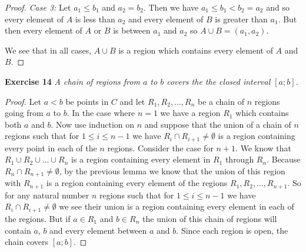 \documentclass{article}
\begin{document}
\begin{flushleft}
\begin{proof}
\textsl{Case 3:} Let $a_1 \leq b_1$ and $a_2=b_2$. Then we have $a_1 \leq b_1<b_2=a_2$ and so every element of $A$ is less than $a_2$ and every element of $B$ is greater than $a_1$. But then every element of $A$ or $B$ is between $a_1$ and $a_2$ so $A \cup B = (a_1,a_2)$.\newline

We see that in all cases, $A \cup B$ is a region which contains every element of $A$ and $B$.
\end{proof}

\textbf{Exercise 14}
\textsl{A chain of regions from $a$ to $b$ covers the the closed interval $[a;b]$.}
\begin{proof}
Let $a<b$ be points in $C$ and let $R_1,R_2, \dots ,R_n$ be a chain of $n$ regions going from $a$ to $b$. In the case where $n=1$ we have a region $R_1$ which contains both $a$ and $b$. Now use induction on $n$ and suppose that the union of a chain of $n$ regions such that for $1 \leq i \leq n-1$ we have $R_i \cap R_{i+1} \neq \emptyset$ is a region containing every point in each of the $n$ regions. Consider the case for $n+1$. We know that $R_1 \cup R_2 \cup  \dots \cup R_n$ is a region containing every element in $R_1$ through $R_n$. Because $R_n \cap R_{n+1} \neq \emptyset$, by the previous lemma we know that the union of this region with $R_{n+1}$ is a region containing every element of the regions $R_1,R_2, \dots ,R_{n+1}$. So for any natural number $n$ regions such that for $1 \leq i \leq n-1$ we have $R_i \cap R_{i+1} \neq \emptyset$ we see their union is a region containing every element in each of the regions. But if $a \in R_1$ and $b \in R_n$ the union of this chain of regions will contain $a$, $b$ and every element between $a$ and $b$. Since each region is open, the chain covers $[a;b]$.
\end{proof}

\end{flushleft}
\end{document}
